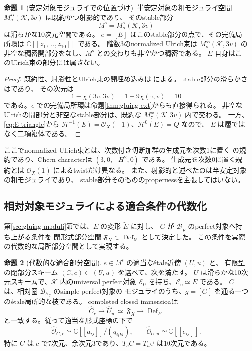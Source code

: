 \documentclass[a4paper,11pt]{ltjsarticle}
\theoremstyle{definition}
\newtheorem{theorem}{命題}[section]
\newcommand{\CC}{\mathbb C}
\newcommand{\OO}{\mathcal O}
\newcommand{\Def}{\operatorname{Def}}
\begin{document}
\begin{theorem}[安定対象モジュライでの位置づけ]\label{thm:stable-ambient}
半安定対象の粗モジュライ空間
$M^{\mathrm{ss}}_\sigma(\mathcal K,3v)$ は既約かつ射影的であり、
そのstable部分
\[
 M^{\mathrm s}=M^{\mathrm s}_\sigma(\mathcal K,3v)
\]
は滑らかな10次元空間である。
$e=[E]$ はこのstable部分の点で、その完備局所環は
$\CC[[z_1,\ldots,z_{10}]]$ である。
階数3のnormalized Ulrich束は $M^{\mathrm{ss}}_\sigma(\mathcal K,3v)$ の
非空な稠密開部分をなし、$M^{\mathrm s}$ との交わりも非空かつ稠密である。
$E$ 自身はこのUlrich束の部分には属さない。
\end{theorem}

\begin{proof}
既約性、射影性とUlrich束の開埋め込みは
\cite[Section 6, Corollary 6.5]{FP}による。
stable部分の滑らかさは\cite[Theorem 1.2]{PY}であり、
その次元は
\[
 1-\chi(3v,3v)=1-9\chi(v,v)=10
\]
である。$e$ での完備局所環は命題\ref{thm:gluing-ext}からも直接得られる。
非空なUlrichの開部分と非空なstable部分は、既約な
$M^{\mathrm{ss}}_\sigma(\mathcal K,3v)$ 内で交わる。
一方、\eqref{eq:E-triangle}から
$\mathcal H^{-1}(E)=\OO_X(-1)$、$\mathcal H^0(E)=Q$ なので、
$E$ は層ではなく二項複体である。
\end{proof}

ここでnormalized Ulrich束とは、次数付き切断加群の生成元を次数1に置く
\cite{FP}の規約であり、Chern characterは $(3,0,-H^2,0)$ である。
生成元を次数0に置く規約とは $\OO_X(1)$ によるtwistだけ異なる。
また、射影的と述べたのは半安定対象の粗モジュライであり、
stable部分そのもののpropernessを主張してはいない。

\subsection{相対対象モジュライによる適合条件の代数化}

第\ref{sec:gluing-moduli}節では、$E$ の変形 $\widetilde E$ に対し、
$G$ が $\mathcal B_{\widetilde E}$ のperfect対象へ持ち上がる条件を
閉形式部分空間 $\mathfrak F_X\subset\Def_E$ として決定した。
この条件を実際の代数的な局所部分空間として実現する。

\begin{theorem}[代数的な適合部分空間]\label{thm:algebraic-compatibility}
$e\in M^{\mathrm s}$ の適当な\'etale近傍 $(U,u)$ と、
有限型の閉部分スキーム $(C,c)\subset(U,u)$ を選べて、次を満たす。
$U$ は滑らかな10次元スキームで、$\mathcal K$ 内のuniversal perfect対象
$\mathcal E_U$ を持ち、$\mathcal E_u\simeq E$ である。
$C$ は、相対圏 $\mathcal B_{\mathcal E_U}$ のsimple perfect対象の
モジュライのうち、$g=[G]$ を通る一つの\'etale局所的な枝である。
completed closed immersionは
\[
 \widehat C_c\longrightarrow\widehat U_u
 \ \simeq\
 \mathfrak F_X\longrightarrow\Def_E
\]
と一致する。従って適当な形式座標の下で
\[
 \widehat{\OO}_{C,c}
  \simeq\CC[[a_{ij}]]/(q_{ijkl}),\qquad
 \widehat{\OO}_{U,u}\simeq\CC[[a_{ij}]].
\]
特に $C$ は $c$ で7次元、余次元3であり、$T_cC=T_uU$ は10次元である。
\end{theorem}
\end{document}
